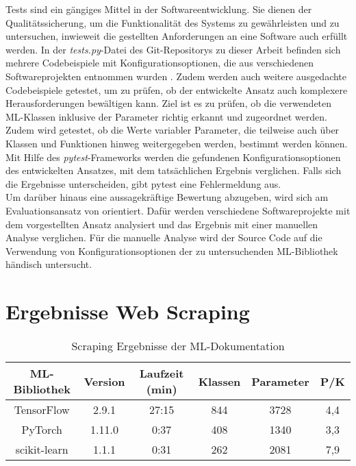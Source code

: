 \documentclass[german,bachelor]{swsLeipzig}
\begin{document}
\noindent Tests sind ein gängiges Mittel in der Softwareentwicklung.
Sie dienen der Qualitätssicherung, um die Funktionalität des Systems zu gewährleisten und zu untersuchen, inwieweit
die gestellten Anforderungen an eine Software auch erfüllt werden.
In der \textit{tests.py}-Datei des Git-Repositorys zu dieser Arbeit befinden sich mehrere Codebeispiele mit Konfigurationsoptionen, die aus
verschiedenen Softwareprojekten entnommen wurden \cite[]{marco}.
Zudem werden auch weitere ausgedachte Codebeispiele getestet, um zu prüfen, ob der entwickelte
Ansatz auch komplexere Herausforderungen bewältigen kann.
Ziel ist es zu prüfen, ob die verwendeten ML-Klassen inklusive der Parameter richtig erkannt und zugeordnet werden.
Zudem wird getestet, ob die Werte variabler Parameter, die teilweise auch über Klassen und Funktionen hinweg weitergegeben werden,
bestimmt werden können.
Mit Hilfe des \textit{pytest}-Frameworks werden die gefundenen Konfigurationsoptionen des entwickelten Ansatzes,
mit dem tatsächlichen Ergebnis verglichen.
Falls sich die Ergebnisse unterscheiden, gibt pytest eine Fehlermeldung aus.\\
\indent Um darüber hinaus eine aussagekräftige Bewertung abzugeben, wird sich am Evaluationsansatz von \citeauthor{10.1145/1985793.1985812}
orientiert.
Dafür werden verschiedene Softwareprojekte mit dem vorgestellten Ansatz analysiert und das Ergebnis mit einer manuellen Analyse verglichen.
Für die manuelle Analyse wird der Source Code auf die Verwendung von Konfigurationsoptionen der zu untersuchenden ML-Bibliothek
händisch untersucht.\\

\section{Ergebnisse Web Scraping}
\begin{table}[H]
\small
\begin{center}
\begin{tabular}[h]{c|c|c|c|c|c}
\hline
ML-Bibliothek & Version & Laufzeit (min) & Klassen & Parameter & P/K\\
\hline \hline
TensorFlow & 2.9.1 & 27:15 & 844 & 3728 & 4,4\\
PyTorch & 1.11.0 & 0:37 & 408 & 1340 & 3,3 \\
scikit-learn & 1.1.1 & 0:31 & 262 & 2081 & 7,9\\
\hline
\end{tabular}
\caption{Scraping Ergebnisse der ML-Dokumentation} \label{scrapresults}
\end{center}
\end{table}
\end{document}

